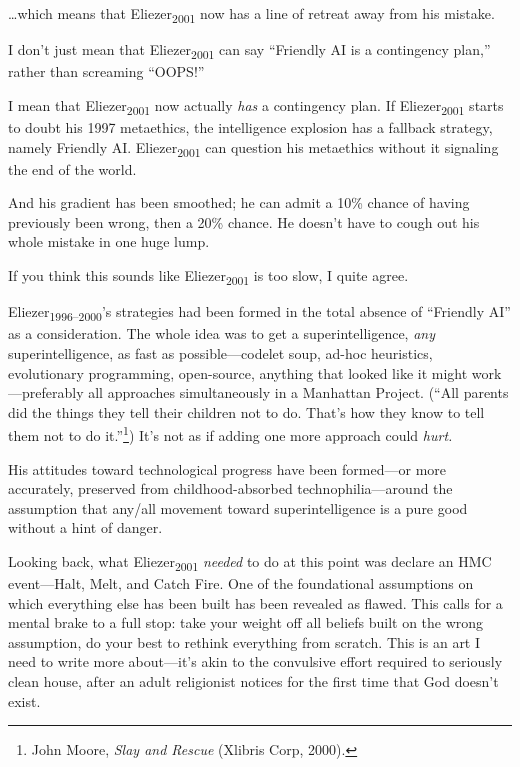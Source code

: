{
 \ldots which means that Eliezer\textsubscript{2001} now has a line
of retreat away from his mistake.}

{
 I don't just mean that Eliezer\textsubscript{2001}
can say ``Friendly AI is a contingency
plan,'' rather than screaming
``OOPS!''}

{
 I mean that Eliezer\textsubscript{2001} now actually \textit{has}
a contingency plan. If Eliezer\textsubscript{2001} starts to doubt his
1997 metaethics, the intelligence explosion has a fallback strategy,
namely Friendly AI. Eliezer\textsubscript{2001} can question his
metaethics without it signaling the end of the world.}

{
 And his gradient has been smoothed; he can admit a 10\% chance of
having previously been wrong, then a 20\% chance. He
doesn't have to cough out his whole mistake in one huge
lump.}

{
 If you think this sounds like Eliezer\textsubscript{2001} is too
slow, I quite agree.}

{
 Eliezer\textsubscript{1996--2000}'s strategies had
been formed in the total absence of ``Friendly
AI'' as a consideration. The whole idea was to get a
superintelligence, \textit{any} superintelligence, as fast as
possible---codelet soup, ad-hoc heuristics, evolutionary programming,
open-source, anything that looked like it might work---preferably all
approaches simultaneously in a Manhattan Project.
(``All parents did the things they tell their children
not to do. That's how they know to tell them not to do
it.''\footnote{John Moore, \textit{Slay and Rescue} (Xlibris Corp, 2000).}) It's not as
if adding one more approach could \textit{hurt.}}

{
 His attitudes toward technological progress have been formed---or
more accurately, preserved from childhood-absorbed
technophilia---around the assumption that any/all movement toward
superintelligence is a pure good without a hint of danger.}

{
 Looking back, what Eliezer\textsubscript{2001} \textit{needed} to
do at this point was declare an HMC event---Halt, Melt, and Catch Fire.
One of the foundational assumptions on which everything else has been
built has been revealed as flawed. This calls for a mental brake to a
full stop: take your weight off all beliefs built on the wrong
assumption, do your best to rethink everything from scratch. This is an
art I need to write more about---it's akin to the
convulsive effort required to seriously clean house, after an adult
religionist notices for the first time that God doesn't
exist.}

